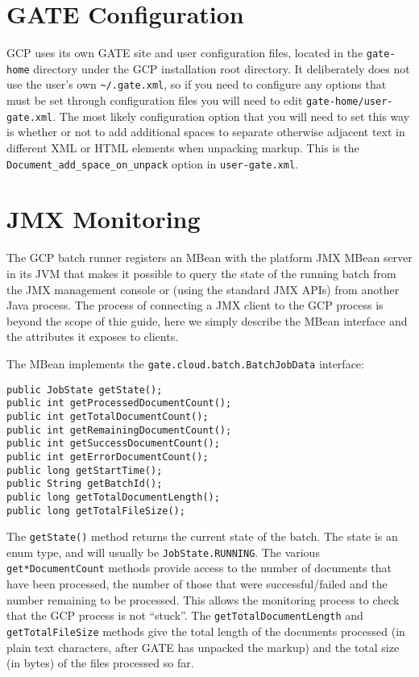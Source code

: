 \section{GATE Configuration}

GCP uses its own GATE site and user configuration files, located in the
\verb!gate-home! directory under the GCP installation root directory.  It
deliberately does not use the user's own \verb!~/.gate.xml!, so if you need to
configure any options that must be set through configuration files you will
need to edit \verb!gate-home/user-gate.xml!.  The most likely configuration
option that you will need to set this way is whether or not to add additional
spaces to separate otherwise adjacent text in different XML or HTML elements
when unpacking markup.  This is the \verb!Document_add_space_on_unpack! option
in \verb!user-gate.xml!.

\section{JMX Monitoring}

The GCP batch runner registers an MBean with the platform JMX MBean server in
its JVM that makes it possible to query the state of the running batch from the
JMX management console or (using the standard JMX APIs) from another Java
process.  The process of connecting a JMX client to the GCP process is beyond
the scope of thie guide, here we simply describe the MBean interface and the
attributes it exposes to clients.

The MBean implements the \verb!gate.cloud.batch.BatchJobData! interface:

\begin{lstlisting}[breaklines]
public JobState getState();
public int getProcessedDocumentCount();
public int getTotalDocumentCount();
public int getRemainingDocumentCount();
public int getSuccessDocumentCount();
public int getErrorDocumentCount();
public long getStartTime();
public String getBatchId();
public long getTotalDocumentLength();
public long getTotalFileSize();
\end{lstlisting}

The \verb!getState()! method returns the current state of the batch.  The state
is an enum type, and will usually be \verb!JobState.RUNNING!.  The various
\verb!get*DocumentCount! methods provide access to the number of documents that
have been processed, the number of those that were successful/failed and the
number remaining to be processed.  This allows the monitoring process to check
that the GCP process is not ``stuck''.  The \verb!getTotalDocumentLength! and
\verb!getTotalFileSize! methods give the total length of the documents
processed (in plain text characters, after GATE has unpacked the markup) and
the total size (in bytes) of the files processed so far.


